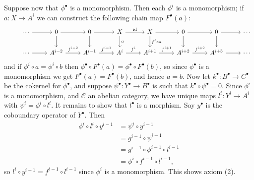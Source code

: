 \documentclass{report}
\newcommand{\id}{{\mathrm{id}}} %
\newcommand{\scrC}{\mathscr{C}}
\begin{document}
\begin{enumerate}[label=\textbf{1.6.\Alph*.}]
	      Suppose now that $\phi^\bullet$ is a monomorphism. Then each $\phi^i$ is
	      a monomorphism; if $a:X\to A^i$ we can construct the following chain
	      map $F^\bullet(a)$:
	      \begin{equation*}
		      \begin{tikzcd}
			      &\cdots \arrow{r}
			      &0 \arrow{r} \arrow{d}
			      &0 \arrow{r} \arrow{d}
			      &X \arrow{r}{\id} \arrow{d}{a}
			      &X \arrow{r} \arrow{d}{f^i\circ a}
			      &0 \arrow{r} \arrow{d}
			      &0 \arrow{r} \arrow{d}
			      &\cdots \\
			      &\cdots \arrow{r}
			      &A^{i-2} \arrow{r}{f^{i-2}}
			      &A^{i-1} \arrow{r}{f^{i-1}}
			      &A^i \arrow{r}{f^i}
			      &A^{i+1} \arrow{r}{f^{i+1}}
			      &A^{i+2} \arrow{r}{f^{i+2}}
			      &A^{i+3} \arrow{r}
			      &\cdots
		      \end{tikzcd}
	      \end{equation*}
	      and if $\phi^i\circ a=\phi^i\circ b$ then
	      $\phi^\bullet\circ F^\bullet(a)=\phi^\bullet\circ F^\bullet(b)$, so
	      since $\phi^\bullet$ is a monomorphism we get $F^\bullet(a)=F^\bullet(b)$,
	      and hence $a=b$. Now let $k^\bullet:B^\bullet\to C^\bullet$ be the
	      cokernel for $\phi^\bullet$, and suppose
	      $\psi^\bullet:Y^\bullet\to B^\bullet$ is such that
	      $k^\bullet\circ\psi^\bullet=0$. Since $\phi^i$ is a monomorphism, and
	      $\scrC$ an abelian category, we have unique maps $l^i:Y^i\to A^i$ with
	      $\psi^i=\phi^i\circ l^i$. It remains to show that $l^\bullet$ is a
	      morphism. Say $y^\bullet$ is the coboundary operator of $Y^\bullet$.
	      Then
	      \begin{align*}
		      \phi^i\circ l^i\circ y^{i-1}
		       & = \psi^i\circ y^{i-1}                 \\
		       & = g^{i-1}\circ\psi^{i-1}              \\
		       & = g^{i-1}\circ\phi^{i-1}\circ l^{i-1} \\
		       & = \phi^i\circ f^{i-1}\circ l^{i-1},
	      \end{align*}
	      so $l^i\circ y^{i-1}=f^{i-1}\circ l^{i-1}$ since $\phi^i$ is a
	      monomorphism. This shows axiom (2).


\end{enumerate}
\end{document}

